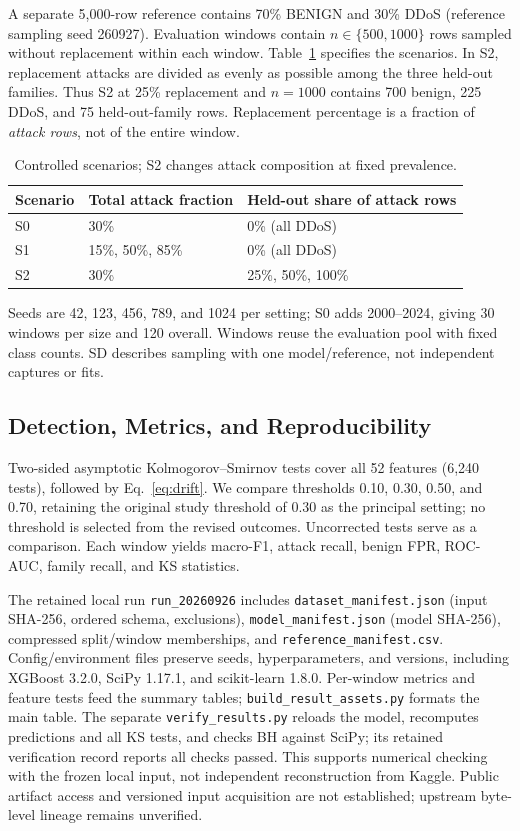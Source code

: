 \documentclass[runningheads]{llncs}
\begin{document}
A separate 5,000-row reference contains 70\% BENIGN and 30\% DDoS (reference sampling seed 260927). Evaluation windows contain $n\in\{500,1000\}$ rows sampled without replacement within each window. Table~\ref{tab:scenarios} specifies the scenarios. In S2, replacement attacks are divided as evenly as possible among the three held-out families. Thus S2 at 25\% replacement and $n=1000$ contains 700 benign, 225 DDoS, and 75 held-out-family rows. Replacement percentage is a fraction of \emph{attack rows}, not of the entire window.

\begin{table}[t]
\caption{Controlled scenarios; S2 changes attack composition at fixed prevalence.}
\label{tab:scenarios}
\centering
\begin{tabular}{@{}lll@{}}
\toprule
Scenario & Total attack fraction & Held-out share of attack rows \\
\midrule
S0 & 30\% & 0\% (all DDoS) \\
S1 & 15\%, 50\%, 85\% & 0\% (all DDoS) \\
S2 & 30\% & 25\%, 50\%, 100\% \\
\bottomrule
\end{tabular}
\end{table}

Seeds are 42, 123, 456, 789, and 1024 per setting; S0 adds 2000--2024, giving 30 windows per size and 120 overall. Windows reuse the evaluation pool with fixed class counts. SD describes sampling with one model/reference, not independent captures or fits.

\subsection{Detection, Metrics, and Reproducibility}
Two-sided asymptotic Kolmogorov--Smirnov tests cover all 52 features (6,240 tests), followed by Eq.~\ref{eq:drift}. We compare thresholds 0.10, 0.30, 0.50, and 0.70, retaining the original study threshold of 0.30 as the principal setting; no threshold is selected from the revised outcomes. Uncorrected tests serve as a comparison. Each window yields macro-F1, attack recall, benign FPR, ROC-AUC, family recall, and KS statistics.

The retained local run \texttt{run\_20260926} includes \texttt{dataset\_manifest.json} (input SHA-256, ordered schema, exclusions), \texttt{model\_manifest.json} (model SHA-256), compressed split/window memberships, and \texttt{reference\_manifest.csv}. Config/environment files preserve seeds, hyperparameters, and versions, including XGBoost 3.2.0, SciPy 1.17.1, and scikit-learn 1.8.0. Per-window metrics and feature tests feed the summary tables; \texttt{build\_result\_assets.py} formats the main table. The separate \texttt{verify\_results.py} reloads the model, recomputes predictions and all KS tests, and checks BH against SciPy; its retained verification record reports all checks passed. This supports numerical checking with the frozen local input, not independent reconstruction from Kaggle. Public artifact access and versioned input acquisition are not established; upstream byte-level lineage remains unverified.
\end{document}
